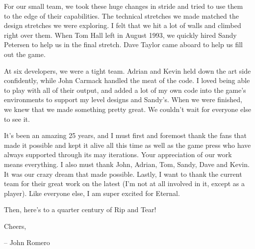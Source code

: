 \par
For our small team, we took these huge changes in stride and tried to use them to the edge of their capabilities. The technical stretches we made matched the design stretches we were exploring. I felt that we hit a lot of walls and climbed right over them. When Tom Hall left in August 1993, we quickly hired Sandy Petersen to help us in the final stretch. Dave Taylor came aboard to help us fill out the game.\\
\par
At six developers, we were a tight team. Adrian and Kevin held down the art side confidently, while John Carmack handled the meat of the code. I loved being able to play with all of their output, and added a lot of my own code into the game's environments to support my level designs and Sandy's. When we were finished, we knew that we made something pretty great. We couldn't wait for everyone else to see it.\\
\par
It's been an amazing 25 years, and I must first and foremost thank the fans that made it possible and kept it alive all this time as well as the game press who have always supported \doom{} through its may iterations. Your appreciation of our work means everything. I also must thank John, Adrian, Tom, Sandy, Dave and Kevin. It was our crazy dream that made \doom{} possible. Lastly, I want to thank the current \doom{} team for their great work on the latest \doom{} (I'm not at all involved in it, except as a player). Like everyone else, I am super excited for \doom{} Eternal.\\
\par
Then, here's to a quarter century of Rip and Tear!\\
\par
Cheers,\\
\par
-- John Romero\\
\par
\thispagestyle{plain} %
